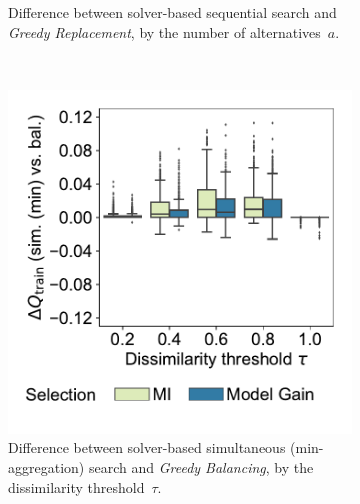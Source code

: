 \documentclass{article}
\theoremstyle{definition}
\begin{document}
\begin{figure}[p]
\begin{subfigure}[t]{0.48\textwidth}
		\caption{
			Difference between solver-based sequential search and \emph{Greedy Replacement}, by the number of alternatives~$a$.
		}
		\label{fig:afs:impact-search-heuristics-metric-diff-seq-num-alternatives}
	\end{subfigure}
	\\ \vspace{\baselineskip}
	\begin{subfigure}[t]{0.48\textwidth}
		\centering
		\includegraphics[width=\textwidth, trim=15 30 15 15, clip]{plots/afs-impact-search-heuristics-metric-diff-sim-tau.pdf}
		\caption{
			Difference between solver-based simultaneous (min-aggregation) search and \emph{Greedy Balancing}, by the dissimilarity threshold~$\tau$.
		}
		\label{fig:afs:impact-search-heuristics-metric-diff-sim-tau}
	\end{subfigure}
	\hfill
	\begin{subfigure}[t]{0.48\textwidth}
		\centering

\end{subfigure}
\end{figure}
\end{document}
